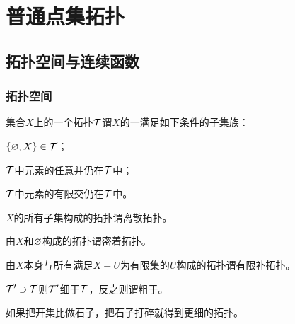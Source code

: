 \documentclass{ctexrep}
\begin{document}
\fi


\chapter{普通点集拓扑}
  \section{拓扑空间与连续函数}
  \subsection{拓扑空间}
  \begin{definition}
  集合$X$上的一个拓扑$\mathcal{T}$谓$X$的一满足如下条件的子集族：
  \begin{cenum}
    \item $\left\{\varnothing, X\right\} \in \mathcal{T}$；
    \item $\mathcal{T}$中元素的任意并仍在$\mathcal{T}$中；
    \item $\mathcal{T}$中元素的有限交仍在$\mathcal{T}$中。
  \end{cenum}
  \end{definition} 
  \begin{definition}
  $X$的所有子集构成的拓扑谓离散拓扑。
  \end{definition}
  \begin{definition}
  由$X$和$\varnothing$构成的拓扑谓密着拓扑。
  \end{definition}
  \begin{definition}
  由$X$本身与所有满足$X-U$为有限集的$U$构成的拓扑谓有限补拓扑。
  \end{definition}
  \begin{definition}
  $\mathcal{T}'\supset\mathcal{T}$则$\mathcal{T}'$细于$\mathcal{T}$，反之则谓粗于。
  \end{definition}
  如果把开集比做石子，把石子打碎就得到更细的拓扑。
\end{document}
